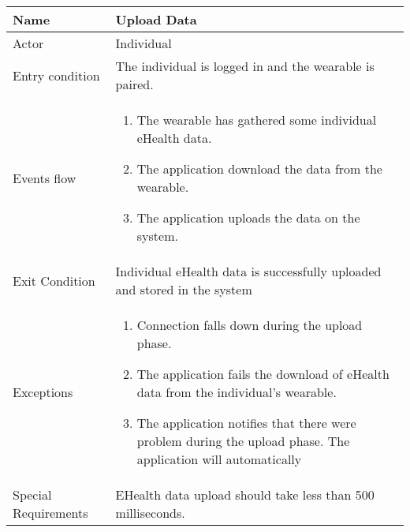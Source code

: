 \begin{tabular}{|l|p{13cm}|}
    \hline
    Name & Upload Data
    \\ \hline
    Actor & Individual
    \\ \hline 
    Entry condition & The individual is logged in and the wearable is paired.
    \\ \hline
    Events flow &
    \begin{enumerate}
    \item The wearable has gathered some individual eHealth data.
    \item The application download the data from the wearable.
    \item The application uploads the data on the system.
    \end{enumerate}
     \\ \hline
     Exit Condition & Individual eHealth data is successfully uploaded and stored in the system
     \\
    \hline
    Exceptions &
        \begin{enumerate}
    \item Connection falls down during the upload phase.
    \item The application fails the download of eHealth data from the individual's wearable.
    \item The application notifies that there were problem during the upload phase. The application will automatically 
    \end{enumerate}
      \\
    \hline
    Special Requirements & EHealth data upload should take less than 500 milliseconds.
\end{tabular}


